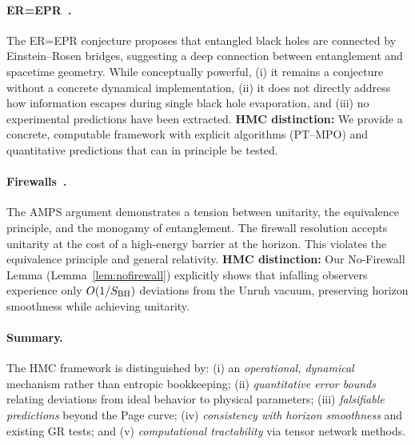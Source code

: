 \documentclass[a4paper,11pt]{article}
\newcommand{\HMC}{\textup{\textsc{HMC}}\xspace}
\theoremstyle{plain}
\theoremstyle{definition}
\theoremstyle{remark}
\begin{document}
\paragraph{ER=EPR~\cite{Maldacena:2013}.}
The ER=EPR conjecture proposes that entangled black holes are connected by Einstein--Rosen bridges, suggesting a deep connection between entanglement and spacetime geometry. While conceptually powerful, (i) it remains a conjecture without a concrete dynamical implementation, (ii) it does not directly address how information escapes during single black hole evaporation, and (iii) no experimental predictions have been extracted.
\textbf{\HMC{} distinction:} We provide a concrete, computable framework with explicit algorithms (PT--MPO) and quantitative predictions that can in principle be tested.

\paragraph{Firewalls~\cite{AMPS:2013}.}
The AMPS argument demonstrates a tension between unitarity, the equivalence principle, and the monogamy of entanglement. The firewall resolution accepts unitarity at the cost of a high-energy barrier at the horizon. This violates the equivalence principle and general relativity.
\textbf{\HMC{} distinction:} Our No-Firewall Lemma (Lemma~\ref{lem:nofirewall}) explicitly shows that infalling observers experience only $O(1/S_{\rm BH})$ deviations from the Unruh vacuum, preserving horizon smoothness while achieving unitarity.

\paragraph{Summary.}
The \HMC{} framework is distinguished by: (i) an \emph{operational, dynamical} mechanism rather than entropic bookkeeping; (ii) \emph{quantitative error bounds} relating deviations from ideal behavior to physical parameters; (iii) \emph{falsifiable predictions} beyond the Page curve; (iv) \emph{consistency with horizon smoothness} and existing GR tests; and (v) \emph{computational tractability} via tensor network methods.
\end{document}
